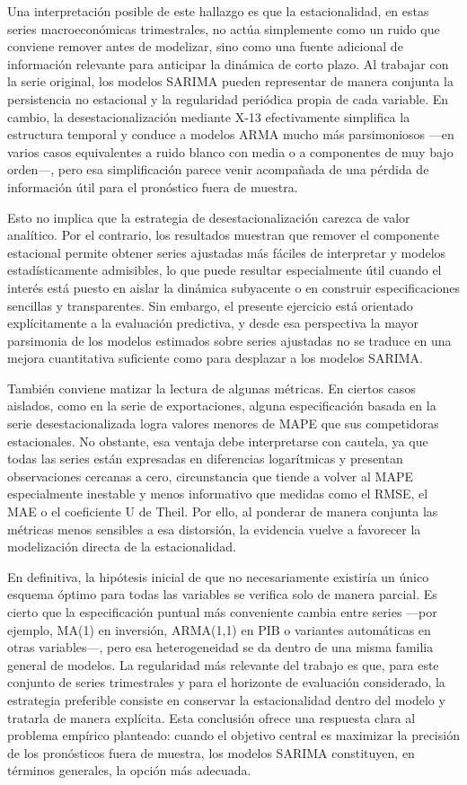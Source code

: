 \documentclass[11pt]{article}
\begin{document}
Una interpretación posible de este hallazgo es que la estacionalidad, en estas series macroeconómicas trimestrales, no actúa simplemente como un ruido que conviene remover antes de modelizar, sino como una fuente adicional de información relevante para anticipar la dinámica de corto plazo. Al trabajar con la serie original, los modelos SARIMA pueden representar de manera conjunta la persistencia no estacional y la regularidad periódica propia de cada variable. En cambio, la desestacionalización mediante X-13 efectivamente simplifica la estructura temporal y conduce a modelos ARMA mucho más parsimoniosos ---en varios casos equivalentes a ruido blanco con media o a componentes de muy bajo orden---, pero esa simplificación parece venir acompañada de una pérdida de información útil para el pronóstico fuera de muestra.

Esto no implica que la estrategia de desestacionalización carezca de valor analítico. Por el contrario, los resultados muestran que remover el componente estacional permite obtener series ajustadas más fáciles de interpretar y modelos estadísticamente admisibles, lo que puede resultar especialmente útil cuando el interés está puesto en aislar la dinámica subyacente o en construir especificaciones sencillas y transparentes. Sin embargo, el presente ejercicio está orientado explícitamente a la evaluación predictiva, y desde esa perspectiva la mayor parsimonia de los modelos estimados sobre series ajustadas no se traduce en una mejora cuantitativa suficiente como para desplazar a los modelos SARIMA.

También conviene matizar la lectura de algunas métricas. En ciertos casos aislados, como en la serie de exportaciones, alguna especificación basada en la serie desestacionalizada logra valores menores de MAPE que sus competidoras estacionales. No obstante, esa ventaja debe interpretarse con cautela, ya que todas las series están expresadas en diferencias logarítmicas y presentan observaciones cercanas a cero, circunstancia que tiende a volver al MAPE especialmente inestable y menos informativo que medidas como el RMSE, el MAE o el coeficiente U de Theil. Por ello, al ponderar de manera conjunta las métricas menos sensibles a esa distorsión, la evidencia vuelve a favorecer la modelización directa de la estacionalidad.

En definitiva, la hipótesis inicial de que no necesariamente existiría un único esquema óptimo para todas las variables se verifica solo de manera parcial. Es cierto que la especificación puntual más conveniente cambia entre series ---por ejemplo, MA(1) en inversión, ARMA(1,1) en PIB o variantes automáticas en otras variables---, pero esa heterogeneidad se da dentro de una misma familia general de modelos. La regularidad más relevante del trabajo es que, para este conjunto de series trimestrales y para el horizonte de evaluación considerado, la estrategia preferible consiste en conservar la estacionalidad dentro del modelo y tratarla de manera explícita. Esta conclusión ofrece una respuesta clara al problema empírico planteado: cuando el objetivo central es maximizar la precisión de los pronósticos fuera de muestra, los modelos SARIMA constituyen, en términos generales, la opción más adecuada.
\end{document}
